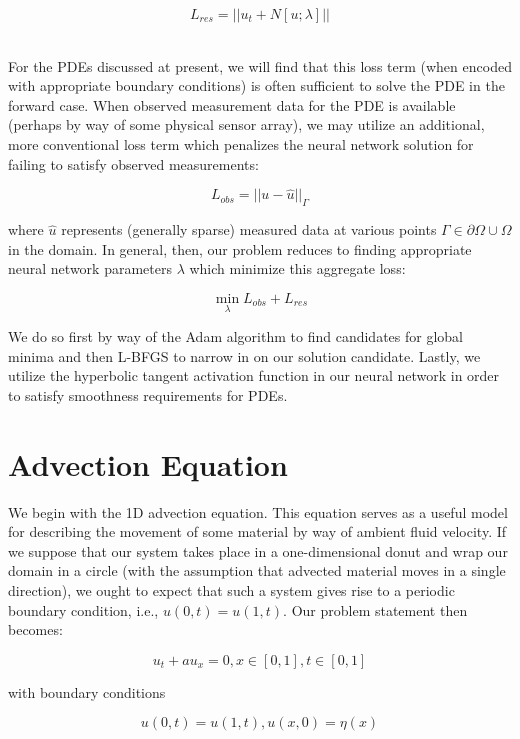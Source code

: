 \documentclass[letterpaper,11pt]{article}
\begin{document}
    $$
    L_{res} = ||u_t + N[u; \lambda]||
    $$

    \ \\
    For the PDEs discussed at present, we will find that this loss term (when encoded with appropriate boundary 
    conditions) is often sufficient to solve the PDE in the forward case. When observed measurement data for the PDE 
    is available (perhaps by way of some physical sensor array), we may utilize an additional, more conventional loss 
    term which penalizes the neural network solution for failing to satisfy observed measurements:

    $$
    L_{obs} = ||u - \hat{u}||_{\Gamma}
    $$

    \noindent where $\hat{u}$ represents (generally sparse) measured data at various points 
    $\Gamma \in \partial \Omega \cup \Omega$ in the domain. In general, then, our problem reduces to finding appropriate
    neural network parameters $\lambda$ which minimize this aggregate loss:
    
    \begin{equation}
        \min_{\lambda}{L_{obs} + L_{res}}
    \end{equation}

    We do so first by way of the Adam\cite{adam} algorithm to find candidates for global minima and then L-BFGS to 
    narrow in on our solution candidate. Lastly, we utilize the hyperbolic tangent activation function in our neural 
    network in order to satisfy smoothness requirements for PDEs.

    \section{Advection Equation}{\label{sec:advection-equation}}
    We begin with the 1D advection equation. This equation serves as a useful model for describing the movement of some
    material by way of ambient fluid velocity. If we suppose that our system takes place in a one-dimensional donut and
    wrap our domain in a circle (with the assumption that advected material moves in a single direction), we ought to
    expect that such a system gives rise to a periodic boundary condition, i.e., $u(0, t) = u(1, t)$. Our problem
    statement then becomes:

    $$
    u_t + a u_x = 0, x \in [0, 1], t \in [0, 1]
    $$

    \noindent with boundary conditions

    $$
    u(0, t) = u(1, t), u(x, 0) = \eta(x)
    $$
\end{document}
